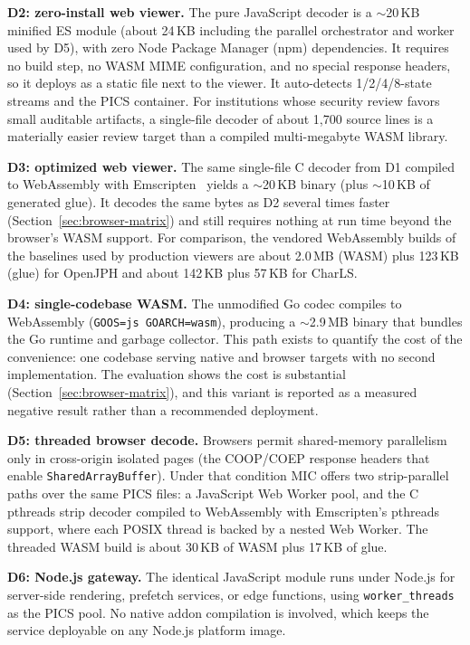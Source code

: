 \documentclass[journal]{IEEEtran}
\begin{document}
\textbf{D2: zero-install web viewer.} The pure JavaScript decoder is a
${\sim}$20\,KB minified ES module (about 24\,KB including the parallel
orchestrator and worker used by D5), with zero Node Package Manager (npm)
dependencies. It requires no build step, no WASM MIME configuration, and no
special response headers, so it deploys as a static file next to the viewer.
It auto-detects 1/2/4/8-state streams and the PICS container. For
institutions whose security review favors small auditable artifacts, a
single-file decoder of about 1,700 source lines is a materially easier
review target than a compiled multi-megabyte WASM library.

\textbf{D3: optimized web viewer.} The same single-file C decoder from D1
compiled to WebAssembly with Emscripten~\cite{zakai2011} yields a
${\sim}$20\,KB binary (plus ${\sim}$10\,KB of generated glue). It decodes the
same bytes as D2 several times faster (Section~\ref{sec:browser-matrix}) and
still requires nothing at run time beyond the browser's WASM support. For
comparison, the vendored WebAssembly builds of the baselines used by
production viewers are about 2.0\,MB (WASM) plus 123\,KB (glue) for OpenJPH
and about 142\,KB plus 57\,KB for CharLS.

\textbf{D4: single-codebase WASM.} The unmodified Go codec compiles to
WebAssembly (\texttt{GOOS=js GOARCH=wasm}), producing a ${\sim}$2.9\,MB
binary that bundles the Go runtime and garbage collector. This path exists to
quantify the cost of the convenience: one codebase serving native and browser
targets with no second implementation. The evaluation shows the cost is
substantial (Section~\ref{sec:browser-matrix}), and this variant is reported
as a measured negative result rather than a recommended deployment.

\textbf{D5: threaded browser decode.} Browsers permit shared-memory
parallelism only in cross-origin isolated pages (the COOP/COEP response
headers that enable \texttt{SharedArrayBuffer}). Under that condition MIC
offers two strip-parallel paths over the same PICS files: a JavaScript Web
Worker pool, and the C pthreads strip decoder compiled to WebAssembly with
Emscripten's pthreads support, where each POSIX thread is backed by a nested
Web Worker. The threaded WASM build is about 30\,KB of WASM plus 17\,KB of
glue.

\textbf{D6: Node.js gateway.} The identical JavaScript module runs under
Node.js for server-side rendering, prefetch services, or edge functions,
using \texttt{worker\_threads} as the PICS pool. No native addon compilation
is involved, which keeps the service deployable on any Node.js platform
image.
\end{document}
